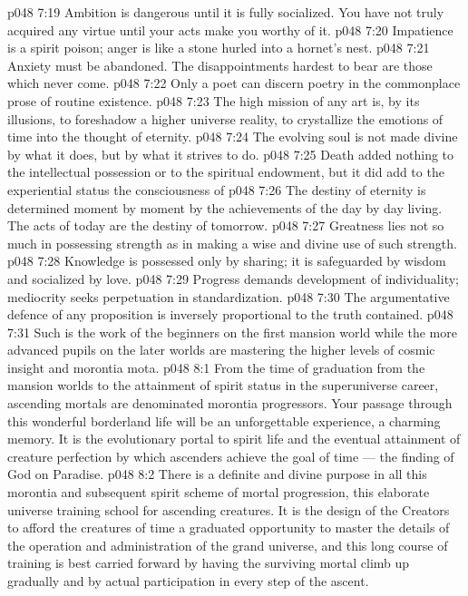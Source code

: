 \vs p048 7:19 \bibnobreakspace Ambition is dangerous until it is fully socialized. You have not truly acquired any virtue until your acts make you worthy of it.
\vs p048 7:20 \bibnobreakspace Impatience is a spirit poison; anger is like a stone hurled into a hornet’s nest.
\vs p048 7:21 \bibnobreakspace Anxiety must be abandoned. The disappointments hardest to bear are those which never come.
\vs p048 7:22 \bibnobreakspace Only a poet can discern poetry in the commonplace prose of routine existence.
\vs p048 7:23 \bibnobreakspace The high mission of any art is, by its illusions, to foreshadow a higher universe reality, to crystallize the emotions of time into the thought of eternity.
\vs p048 7:24 \bibnobreakspace The evolving soul is not made divine by what it does, but by what it strives to do.
\vs p048 7:25 \bibnobreakspace Death added nothing to the intellectual possession or to the spiritual endowment, but it did add to the experiential status the consciousness of 
\vs p048 7:26 \bibnobreakspace The destiny of eternity is determined moment by moment by the achievements of the day by day living. The acts of today are the destiny of tomorrow.
\vs p048 7:27 \bibnobreakspace Greatness lies not so much in possessing strength as in making a wise and divine use of such strength.
\vs p048 7:28 \bibnobreakspace Knowledge is possessed only by sharing; it is safeguarded by wisdom and socialized by love.
\vs p048 7:29 \bibnobreakspace Progress demands development of individuality; mediocrity seeks perpetuation in standardization.
\vs p048 7:30 \bibnobreakspace The argumentative defence of any proposition is inversely proportional to the truth contained.
\vs p048 7:31 \pc Such is the work of the beginners on the first mansion world while the more advanced pupils on the later worlds are mastering the higher levels of cosmic insight and morontia mota.
\vs p048 8:1 From the time of graduation from the mansion worlds to the attainment of spirit status in the superuniverse career, ascending mortals are denominated morontia progressors. Your passage through this wonderful borderland life will be an unforgettable experience, a charming memory. It is the evolutionary portal to spirit life and the eventual attainment of creature perfection by which ascenders achieve the goal of time --- the finding of God on Paradise.
\vs p048 8:2 There is a definite and divine purpose in all this morontia and subsequent spirit scheme of mortal progression, this elaborate universe training school for ascending creatures. It is the design of the Creators to afford the creatures of time a graduated opportunity to master the details of the operation and administration of the grand universe, and this long course of training is best carried forward by having the surviving mortal climb up gradually and by actual participation in every step of the ascent.

